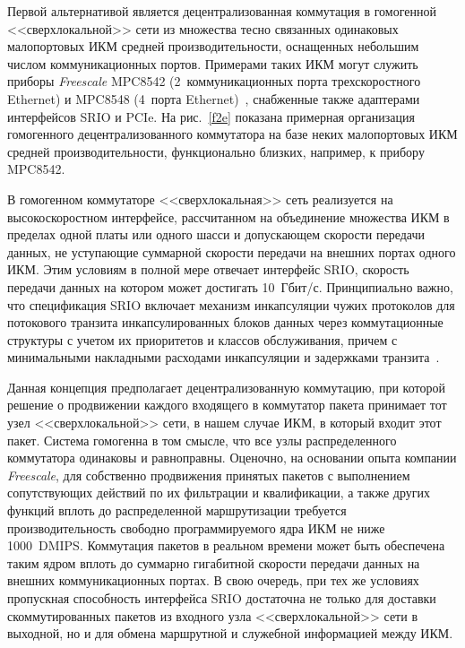 \begin{multicols}{2}
     Первой альтернативой является децентрализованная коммутация в гомогенной 
<<сверхлокальной>> сети из множества тесно связанных одина\-ковых малопортовых ИКМ 
средней производительности, оснащенных небольшим числом коммуникационных портов. 
Примерами таких ИКМ %
могут служить приборы  \textit{Freescale} MPC8542 
(2~коммуникационных порта трехскоростного Ethernet) и MPC8548 (4~порта 
Ethernet)~\cite{12e}, снабженные также адаптерами интерфейсов SRIO и PCIe. На 
рис.~\ref{f2e} показана примерная организация гомогенного децентрализованного 
коммутатора на базе \mbox{неких} малопортовых ИКМ средней про\-из\-во\-ди\-тель\-ности, 
функционально близких, например, к прибору MPC8542.
     
   
     В гомогенном коммутаторе <<сверхлокальная>> сеть реализуется на 
высокоскоростном интерфейсе, рассчитанном на объединение множества ИКМ в пределах 
одной платы или одного шасси и допускающем скорости передачи данных, не уступающие 
суммарной скорости передачи на внешних портах одного ИКМ. Этим условиям в полной 
мере отвечает интерфейс SRIO, скорость передачи данных на котором может достигать 
10~Гбит/с. Принципиально важно, что спецификация SRIO включает механизм 
инкапсуляции чужих протоколов для потокового транзита инкапсулированных блоков 
данных через коммутационные структуры с учетом их приоритетов и классов обслуживания, 
причем с минимальными накладными расходами инкапсуляции и задержками 
транзита~\cite{13e}.
     
     Данная концепция предполагает децентрализованную коммутацию, при которой 
решение о продвижении каждого входящего в коммутатор пакета принимает тот узел 
<<сверхлокальной>> сети, в нашем случае ИКМ, в который входит этот пакет. Система 
гомогенна в том смысле, что все узлы распределенного коммутатора одинаковы и 
равноправны. Оценочно, на основании опыта компании \textit{Freescale}, для собственно 
продвижения принятых пакетов с выполнением сопутствующих действий по их фильт\-ра\-ции 
и квалификации, а также других функций вплоть до распределенной маршрутизации 
требуется производительность свободно про\-грам\-ми\-ру\-емо\-го ядра ИКМ не ниже 
1000~DMIPS. Коммутация пакетов в реальном времени может быть обеспечена таким ядром 
вплоть до суммарно гигабитной скорости передачи данных на внешних коммуникационных 
портах. В свою очередь, при тех же условиях пропускная способность интерфейса SRIO 
достаточна не только для доставки скоммутированных пакетов из входного узла 
<<сверхлокальной>> сети в выходной, но и для обмена маршрутной и служебной 
информацией между ИКМ.
     

\end{multicols}
